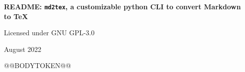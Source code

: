 \documentclass[a4paper, 12pt, twoside]{@@DOCUMENTCLASSTOKEN@@}
\begin{document}
	\onehalfspacing

	\begin{titlepage}
		\begin{center}
			\hspace{0pt}

			\vfill

			\begin{Huge}
				\textbf{README: \texttt{md2tex}, a customizable python CLI to convert Markdown to TeX}
			\end{Huge}

			\vfill

			\begin{large}
				Licensed under GNU GPL-3.0

				\bigskip

				August 2022
			\end{large}
		\end{center}
	\end{titlepage}

@@BODYTOKEN@@

\clearpage
\tableofcontents
\end{document}
